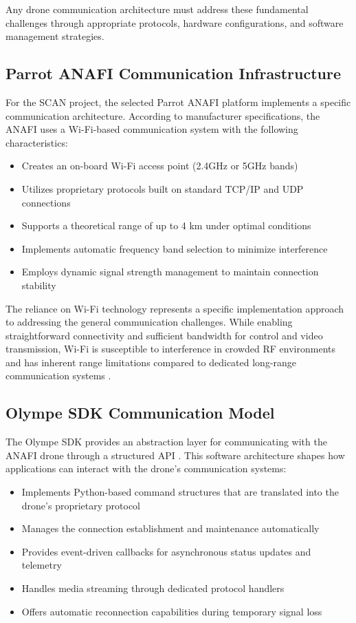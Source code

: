Any drone communication architecture must address these fundamental challenges through appropriate protocols, hardware configurations, and software management strategies.

\subsection{Parrot ANAFI Communication Infrastructure}

For the SCAN project, the selected Parrot ANAFI platform implements a specific communication architecture. According to manufacturer specifications, the ANAFI uses a Wi-Fi-based communication system with the following characteristics:

\begin{itemize}
    \item Creates an on-board Wi-Fi access point (2.4GHz or 5GHz bands) \cite{ParrotANAFISpec}
    \item Utilizes proprietary protocols built on standard TCP/IP and UDP connections \cite{ParrotSDKDoc}
    \item Supports a theoretical range of up to 4 km under optimal conditions \cite{ParrotANAFISpec}
    \item Implements automatic frequency band selection to minimize interference \cite{ParrotSDKDoc}
    \item Employs dynamic signal strength management to maintain connection stability \cite{ParrotSDKArch}
\end{itemize}

The reliance on Wi-Fi technology represents a specific implementation approach to addressing the general communication challenges. While enabling straightforward connectivity and sufficient bandwidth for control and video transmission, Wi-Fi is susceptible to interference in crowded RF environments and has inherent range limitations compared to dedicated long-range communication systems \cite{Yanmaz2018}.

\subsection{Olympe SDK Communication Model}

The Olympe SDK provides an abstraction layer for communicating with the ANAFI drone through a structured API \cite{ParrotOlympeDoc}. This software architecture shapes how applications can interact with the drone's communication systems:

\begin{itemize}
    \item Implements Python-based command structures that are translated into the drone's proprietary protocol
    \item Manages the connection establishment and maintenance automatically
    \item Provides event-driven callbacks for asynchronous status updates and telemetry
    \item Handles media streaming through dedicated protocol handlers
    \item Offers automatic reconnection capabilities during temporary signal loss
\end{itemize}

